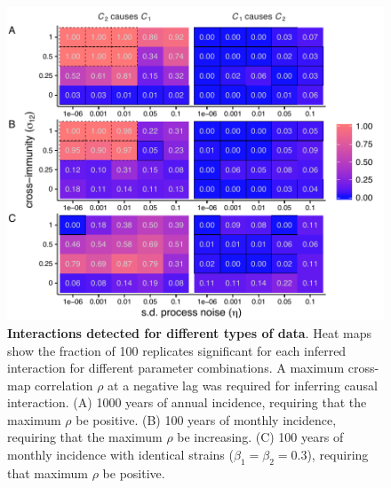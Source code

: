 \begin{figure}%
\begin{center}
  \includegraphics[width=6in]{dataflow/out/fig_detect_diffdata_lag/fig_detect_diffdata_lag.pdf}
  \end{center}
  \caption{\textbf{Interactions detected for different types of data}. Heat maps show the fraction of 100 replicates significant for each inferred interaction for different parameter combinations. A maximum cross-map correlation $\rho$ at a negative lag was required for inferring causal interaction. (A) 1000 years of annual incidence, requiring that the maximum $\rho$ be positive. (B) 100 years of monthly incidence, requiring that the maximum $\rho$ be increasing. (C) 100 years of monthly incidence with identical strains ($\beta_1=\beta_2=0.3$), requiring that maximum $\rho$ be positive.  \label{fig:detect_diffdata_lag}}
\end{figure}

